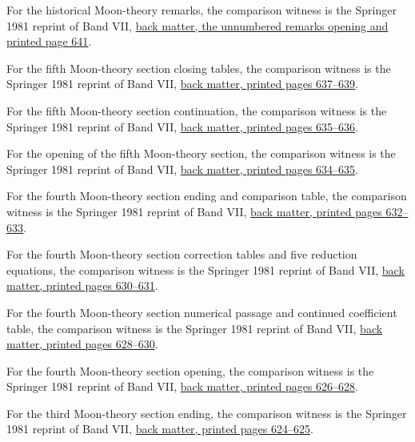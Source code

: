 For the historical Moon-theory remarks, the comparison witness is the Springer 1981 reprint of Band VII, \href{https://link.springer.com/content/pdf/bbm:978-3-642-92478-1/1}{back matter, the unnumbered remarks opening and printed page 641}.



For the fifth Moon-theory section closing tables, the comparison witness is the Springer 1981 reprint of Band VII, \href{https://link.springer.com/content/pdf/bbm:978-3-642-92478-1/1}{back matter, printed pages 637--639}.



For the fifth Moon-theory section continuation, the comparison witness is the Springer 1981 reprint of Band VII, \href{https://link.springer.com/content/pdf/bbm:978-3-642-92478-1/1}{back matter, printed pages 635--636}.



For the opening of the fifth Moon-theory section, the comparison witness is the Springer 1981 reprint of Band VII, \href{https://link.springer.com/content/pdf/bbm:978-3-642-92478-1/1}{back matter, printed pages 634--635}.



For the fourth Moon-theory section ending and comparison table, the comparison witness is the Springer 1981 reprint of Band VII, \href{https://link.springer.com/content/pdf/bbm:978-3-642-92478-1/1}{back matter, printed pages 632--633}.



For the fourth Moon-theory section correction tables and five reduction equations, the comparison witness is the Springer 1981 reprint of Band VII, \href{https://link.springer.com/content/pdf/bbm:978-3-642-92478-1/1}{back matter, printed pages 630--631}.



For the fourth Moon-theory section numerical passage and continued coefficient table, the comparison witness is the Springer 1981 reprint of Band VII, \href{https://link.springer.com/content/pdf/bbm:978-3-642-92478-1/1}{back matter, printed pages 628--630}.



For the fourth Moon-theory section opening, the comparison witness is the Springer 1981 reprint of Band VII, \href{https://link.springer.com/content/pdf/bbm:978-3-642-92478-1/1}{back matter, printed pages 626--628}.



For the third Moon-theory section ending, the comparison witness is the Springer 1981 reprint of Band VII, \href{https://link.springer.com/content/pdf/bbm:978-3-642-92478-1/1}{back matter, printed pages 624--625}.



